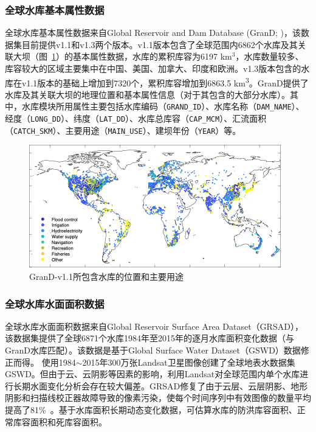 \subsubsection{全球水库基本属性数据}
全球水库基本属性数据来自Global Reservoir and Dam Database (GranD; \citet{lehner2011high})，该数据集目前提供v1.1和v1.3两个版本。v1.1版本包含了全球范围内6862个水库及其关联大坝（图~\ref{fig:GranD-v1.1所包含水库的位置和主要用途}）的基本属性数据，水库的累积库容为6197 km$^{3}$，水库数量较多、库容较大的区域主要集中在中国、美国、加拿大、印度和欧洲。v1.3版本包含的水库在v1.1版本的基础上增加到7320个，累积库容增加到6863.5 \unit{km^3}。GranD提供了水库及其关联大坝的地理位置和基本属性信息（对于其包含的大部分水库）。其中，水库模块所用属性主要包括水库编码（\texttt{GRAND\_ID}）、水库名称（\texttt{DAM\_NAME}）、经度（\texttt{LONG\_DD}）、纬度（\texttt{LAT\_DD}）、水库总库容（\texttt{CAP\_MCM}）、汇流面积（\texttt{CATCH\_SKM}）、主要用途（\texttt{MAIN\_USE}）、建坝年份（\texttt{YEAR}）等。

{
\begin{figure}[htbp]
\centering
\includegraphics{Figures/基础数据/GranD-v1.1所包含水库的位置和主要用途.png}
\caption{GranD-v1.1所包含水库的位置和主要用途}
\label{fig:GranD-v1.1所包含水库的位置和主要用途}
\end{figure}
}


\subsubsection{全球水库水面面积数据}
全球水库水面面积数据来自Global Reservoir Surface Area Dataset（GRSAD），该数据集提供了全球6871个水库1984年至2015年的逐月水库面积变化数据（与GranD水库匹配）。该数据是基于Global Surface Water Dataset（GSWD）数据修正而得。\citet{pekel2016high} 使用1984$\sim$2015年300万张Landsat卫星图像创建了全球地表水数据集GSWD。但由于云、云阴影等因素的影响，利用Landsat对全球范围内单个水库进行长期水面变化分析会存在较大偏差。GRSAD修复了由于云层、云层阴影、地形阴影和扫描线校正器故障导致的像素污染，使每个时间序列中有效图像的数量平均提高了81\%~\citep{zhao2018automatic}。基于水库面积长期动态变化数据，可估算水库的防洪库容面积、正常库容面积和死库容面积。


